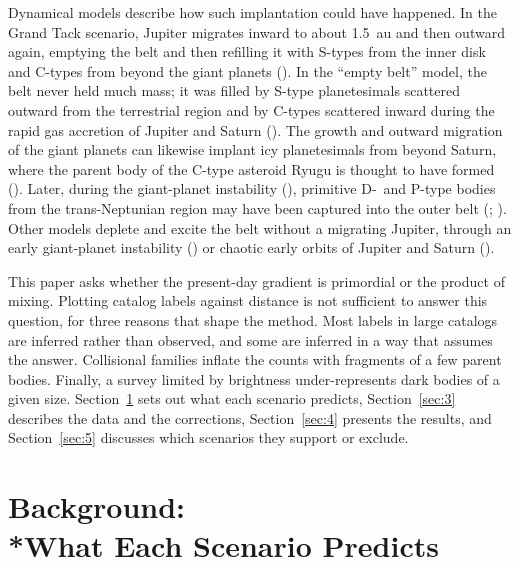 \documentclass[twocolumn]{aastex701}
\begin{document}
Dynamical models describe how such implantation could have happened. In the Grand Tack scenario, Jupiter migrates inward to about 1.5~au and then outward again, emptying the belt and then refilling it with S-types from the inner disk and C-types from beyond the giant planets (\citealt{walsh2011}). In the “empty belt” model, the belt never held much mass; it was filled by S-type planetesimals scattered outward from the terrestrial region and by \mbox{C-types} scattered inward during the rapid gas accretion of Jupiter and Saturn (\citealt{raymond2017a,raymond2017b}). The growth and outward migration of the giant planets can likewise implant icy planetesimals from beyond Saturn, where the parent body of the C-type asteroid Ryugu is thought to have formed (\citealt{takeichi2026}). Later, during the giant-planet instability (\citealt{tsiganis2005}), primitive \mbox{D-}~and P-type bodies from the trans-Neptunian region may have been captured into the outer belt (\citealt{levison2009}; \citealt{vokrouhlicky2016}). Other models deplete and excite the belt without a migrating Jupiter, through an early giant-planet instability (\citealt{clement2019}) or chaotic early orbits of Jupiter and Saturn (\citealt{izidoro2016}).

This paper asks whether the present-day gradient is primordial or the product of mixing. Plotting catalog labels against distance is not sufficient to answer this question, for three reasons that shape the method. Most labels in large catalogs are inferred rather than observed, and some are inferred in a way that assumes the answer. Collisional families inflate the counts with fragments of a few parent bodies. Finally, a survey limited by brightness under-represents dark bodies of a given size. Section~\ref{sec:2} sets out what each scenario predicts, Section~\ref{sec:3} describes the data and the corrections, Section~\ref{sec:4} presents the results, and Section~\ref{sec:5} discusses which scenarios they support or exclude.

\section{Background: \texorpdfstring{\\*}{}What Each Scenario Predicts}\label{sec:2}
\end{document}
